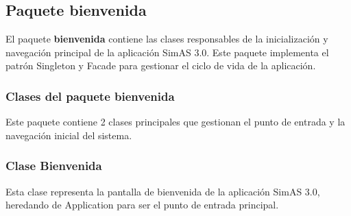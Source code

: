 \subsection{Paquete bienvenida}

El paquete \textbf{bienvenida} contiene las clases responsables de la inicialización y navegación principal de la aplicación SimAS 3.0. Este paquete implementa el patrón Singleton y Facade para gestionar el ciclo de vida de la aplicación.

\subsubsection{Clases del paquete bienvenida}

Este paquete contiene 2 clases principales que gestionan el punto de entrada y la navegación inicial del sistema.

\subsubsection{Clase Bienvenida}

Esta clase representa la pantalla de bienvenida de la aplicación SimAS 3.0, heredando de Application para ser el punto de entrada principal.

